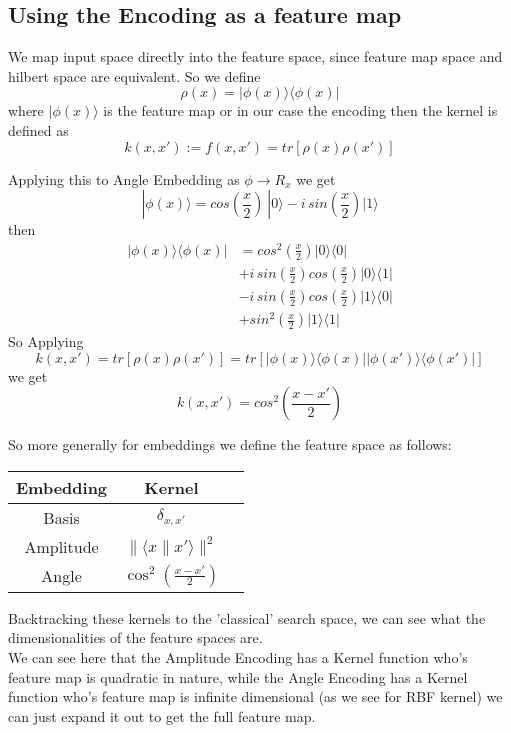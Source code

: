 \documentclass[hidelinks]{book}
\numberwithin{equation}{section}
\begin{document}
\subsection{Using the Encoding as a feature map}
We map input space directly into the feature space, since feature map space
 and hilbert space are equivalent.
So we define
$$\rho(x) = |\phi(x)\rangle \langle\phi(x)|$$ where $|\phi(x)\rangle$ is the
feature map or in our case the encoding then the kernel is defined as
$$k(x, x') := f(x,x') = tr[\rho(x) \rho(x')]$$

Applying this to Angle Embedding as $\phi \rightarrow R_x$ we get
$$|\phi(x)\rangle = cos(\frac{x}{2}) \ |0\rangle - i\, sin(\frac{x}{2}) |1\rangle$$
then
\begin{equation}
\begin{split}
|\phi(x)\rangle\langle\phi(x)| & = cos^2(\frac{x}{2}) |0\rangle\langle0| \\
& + i\, sin(\frac{x}{2}) cos(\frac{x}{2}) |0\rangle\langle1| \\
& - i\, sin(\frac{x}{2}) cos(\frac{x}{2}) |1\rangle\langle0| \\
& + sin^2(\frac{x}{2}) |1\rangle\langle1|
\end{split}
\end{equation}
So Applying
$$ k(x,x') = tr[\rho(x) \rho(x')] = tr[|\phi(x)\rangle\langle\phi(x)| |\phi(x')\rangle\langle\phi(x')|]$$
we get
$$k(x,x') = cos^2(\frac{x-x'}{2})$$

So more generally for embeddings we define the feature space as follows:
\begin{center}
\begin{tabular}{ |c|c|c| }
  \hline
  Embedding & Kernel \\
  \hline
  Basis & $\delta_{x,x'}$ \\
  Amplitude & $\|\langle x\|x'\rangle\|^2$ \\
  Angle & $\cos^2(\frac{x-x'}{2})$ \\
  \hline
\end{tabular}
\end{center}

Backtracking these kernels to the 'classical' search space, we can see
what the dimensionalities of the feature spaces are. \\

We can see here that the Amplitude Encoding has a Kernel function who's feature map is quadratic in nature,
while the Angle Encoding has a Kernel function who's feature map is infinite dimensional (as we see for RBF kernel)
we can just expand it out to get the full feature map.\\
\end{document}
